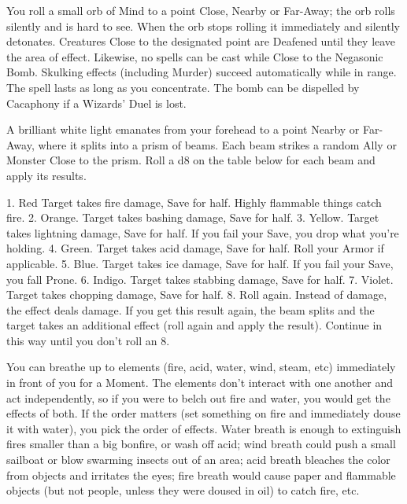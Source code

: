 {You roll a small orb of Mind to a point Close, Nearby or Far-Away; the orb
rolls silently and is hard to see.  When the orb stops rolling it
immediately and silently detonates.  Creatures Close to the designated point
are Deafened until they leave the area of effect.  Likewise, no spells can
be cast while Close to the Negasonic Bomb.  Skulking effects (including
Murder) succeed automatically while in range.  The spell lasts as long as
you concentrate.  The bomb can be dispelled by Cacaphony if a Wizards' Duel
is lost.





\SPELL[
  Name=Prismatic Ray,
  Link=wizardry-prismatic-ray,
  Paradigm=Entropy,
  Save=Y (half),
  Duration=0,
  Counter=n/a ,
  Keywords=Splittable,
  Target=Nearby or Far-Away
]



A brilliant white light emanates from your forehead to a point Nearby or
Far-Away, where it splits into a prism of \DICE beams.  Each beam strikes a
random Ally or Monster Close to the prism.  Roll a d8 on the table below for
each beam and apply its results.

1. Red  Target takes \DICE fire damage, Save for half. Highly flammable
things catch fire.
2. Orange.  Target takes \DICE bashing damage, Save for half. 
3. Yellow. Target takes \DICE lightning damage, Save for half.  If you fail
your Save, you drop what you're holding.
4. Green. Target takes \DICE acid damage, Save for half. Roll your Armor \UD
if applicable.
5. Blue. Target takes \DICE ice damage, Save for half. If you fail your
Save, you fall Prone.
6. Indigo. Target takes \DICE stabbing damage, Save for half.
7. Violet. Target takes \DICE chopping damage, Save for half.
8. Roll again.  Instead of \DICE damage, the effect deals \SUMDICE damage.
If you get this result again, the beam splits and the target takes an
additional effect (roll again and apply the result).  Continue in this way
until you don't roll an 8.





\SPELL[
  Name=Pritchard's Gusty Belch,
  Link=wizardry-pritchards-gusty-belch,
  Paradigm=Biomancy,
  Save=N,
  Duration=0,
  Counter=n/a ,
  Keywords=None,
  Target=Close and Nearby Area
]



You can breathe up to \DICE elements (fire, acid, water, wind, steam, etc)
immediately in front of you for a Moment.  The elements don't interact with
one another and act independently, so if you were to belch out fire and
water, you would get the effects of both.  If the order matters (set
something on fire and immediately douse it with water), you pick the order
of effects.  Water breath is enough to extinguish fires smaller than a big
bonfire, or wash off acid; wind breath could push a small sailboat or blow
swarming insects out of an area; acid breath bleaches the color from objects
and irritates the eyes; fire breath would cause paper and flammable objects
(but not people, unless they were doused in oil) to catch fire, etc.




}
